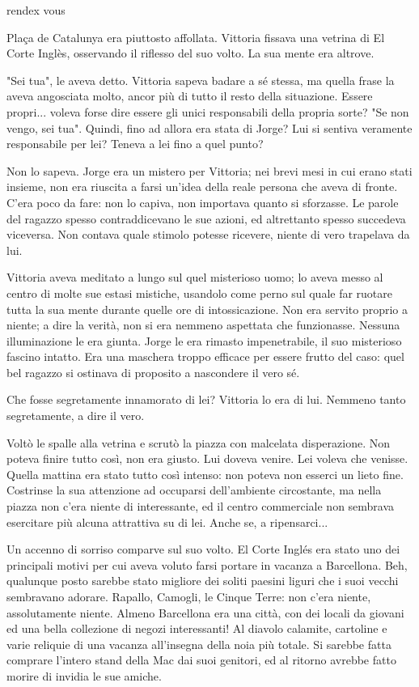 rendex vous


Plaça de Catalunya era piuttosto affollata. Vittoria fissava una vetrina di El Corte Inglès, osservando il riflesso del suo volto. La sua mente era altrove.

"Sei tua", le aveva detto. Vittoria sapeva badare a sé stessa, ma quella frase la aveva angosciata molto, ancor più di tutto il resto della situazione. Essere propri... voleva forse dire essere gli unici responsabili della propria sorte? "Se non vengo, sei tua". Quindi, fino ad allora era stata di Jorge? Lui si sentiva veramente responsabile per lei? Teneva a lei fino a quel punto?

Non lo sapeva. Jorge era un mistero per Vittoria; nei brevi mesi in cui erano stati insieme, non era riuscita a farsi un'idea della reale persona che aveva di fronte. C'era poco da fare: non lo capiva, non importava quanto si sforzasse. Le parole del ragazzo spesso contraddicevano le sue azioni, ed altrettanto spesso succedeva viceversa. Non contava quale stimolo potesse ricevere, niente di vero trapelava da lui.

Vittoria aveva meditato a lungo sul quel misterioso uomo; lo aveva messo al centro di molte sue estasi mistiche, usandolo come perno sul quale far ruotare tutta la sua mente durante quelle ore di intossicazione. Non era servito proprio a niente; a dire la verità, non si era nemmeno aspettata che funzionasse. Nessuna illuminazione le era giunta. Jorge le era rimasto impenetrabile, il suo misterioso fascino intatto. Era una maschera troppo efficace per essere frutto del caso: quel bel ragazzo si ostinava di proposito a nascondere il vero sé.

Che fosse segretamente innamorato di lei? Vittoria lo era di lui. Nemmeno tanto segretamente, a dire il vero.

Voltò le spalle alla vetrina e scrutò la piazza con malcelata disperazione. Non poteva finire tutto così, non era giusto. Lui doveva venire. Lei voleva che venisse. Quella mattina era stato tutto così intenso: non poteva non esserci un lieto fine. Costrinse la sua attenzione ad occuparsi dell'ambiente circostante, ma nella piazza non c'era niente di interessante, ed il centro commerciale non sembrava esercitare più alcuna attrattiva su di lei. Anche se, a ripensarci...

Un accenno di sorriso comparve sul suo volto. El Corte Inglés era stato uno dei principali motivi per cui aveva voluto farsi portare in vacanza a Barcellona. Beh, qualunque posto sarebbe stato migliore dei soliti paesini liguri che i suoi vecchi sembravano adorare. Rapallo, Camogli, le Cinque Terre: non c'era niente, assolutamente niente. Almeno Barcellona era una città, con dei locali da giovani ed una bella collezione di negozi interessanti! Al diavolo calamite, cartoline e varie reliquie di una vacanza all'insegna della noia più totale. Si sarebbe fatta comprare l'intero stand della Mac dai suoi genitori, ed al ritorno avrebbe fatto morire di invidia le sue amiche.


